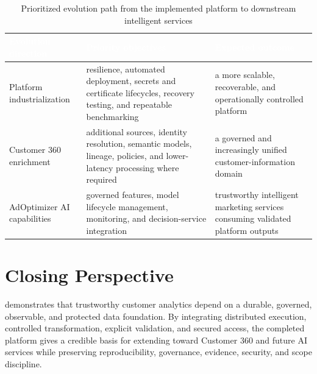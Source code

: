 \begin{table}[!htbp]
    \centering
    \footnotesize
    \renewcommand{\arraystretch}{1.15}
    \begin{tabularx}{\textwidth}{|L{0.20\textwidth}|Y|Y|}
        \hline
        \textcolor{white}{\textbf{Evolution direction}} & \textcolor{white}{\textbf{Priority objectives}} & \textcolor{white}{\textbf{Expected outcome}} \\
        \hline
        Platform industrialization & resilience, automated deployment, secrets and certificate lifecycles, recovery testing, and repeatable benchmarking & a more scalable, recoverable, and operationally controlled platform \\
        \hline
        Customer 360 enrichment & additional sources, identity resolution, semantic models, lineage, policies, and lower-latency processing where required & a governed and increasingly unified customer-information domain \\
        \hline
        AdOptimizer AI capabilities & governed features, model lifecycle management, monitoring, and decision-service integration & trustworthy intelligent marketing services consuming validated platform outputs \\
        \hline
    \end{tabularx}
    \caption{Prioritized evolution path from the implemented platform to downstream intelligent services}
    \label{tab:chapter10-evolution-path}
\end{table}
\FloatBarrier

\section{Closing Perspective}
\projectname{} demonstrates that trustworthy customer analytics depend on a durable, governed, observable, and protected data foundation. By integrating distributed execution, controlled transformation, explicit validation, and secured access, the completed platform gives \companyname{} a credible basis for extending \initiative{} toward Customer 360 and future AI services while preserving reproducibility, governance, evidence, security, and scope discipline.
